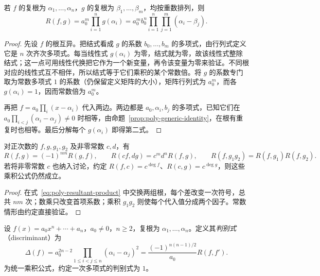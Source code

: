 \begin{theorem}[结式的根表达式]
\label{thm:poly-resultant-product}
若 $f$ 的复根为 $\alpha_1,\ldots,\alpha_n$，$g$ 的复根为 $\beta_1,\ldots,\beta_m$，均按重数排列，则
\begin{equation}
\label{eq:poly-resultant-product}
    R(f,g)=a_0^m\prod_{i=1}^n g(\alpha_i)
    =a_0^mb_0^n\prod_{i=1}^n\prod_{j=1}^m(\alpha_i-\beta_j).
\end{equation}
\end{theorem}
\begin{proof}
先设 $f$ 的根互异。把结式看成 $g$ 的系数 $b_0,\ldots,b_m$ 的多项式，由行列式定义它是 $n$ 次齐次多项式。每当线性式 $g(\alpha_i)$ 为零，结式就为零，故该线性式整除结式；这一点可用线性代换把它作为一个新变量，再令该变量为零来验证。不同根对应的线性式互不相伴，所以结式等于它们乘积的某个常数倍。将 $g$ 的系数专门取为常数多项式 $1$ 的系数（仍保留定义矩阵的大小），矩阵行列式为 $a_0^m$，而各 $g(\alpha_i)=1$，因而常数倍为 $a_0^m$。

再把 $f=a_0\prod_i(x-\alpha_i)$ 代入两边。两边都是 $a_0,\alpha_i,b_j$ 的多项式，已知它们在 $a_0\prod_{i<j}(\alpha_i-\alpha_j)\ne0$ 时相等，由命题~\ref{prop:poly-generic-identity}，在根有重复时也相等。最后分解每个 $g(\alpha_i)$ 即得第二式。
\end{proof}

\begin{corollary}
\label{cor:poly-resultant-properties}
对正次数的 $f,g,g_1,g_2$ 及非零常数 $c,d$，有
\[
    R(f,g)=(-1)^{nm}R(g,f),\qquad
    R(cf,dg)=c^md^nR(f,g),\qquad
    R(f,g_1g_2)=R(f,g_1)R(f,g_2).
\]
若将非零常数 $c$ 也纳入讨论，约定 $R(f,c)=c^{\deg f}$、$R(c,g)=c^{\deg g}$，则这些乘积公式仍然成立。
\end{corollary}
\begin{proof}
在式~\eqref{eq:poly-resultant-product} 中交换两组根，每个差改变一次符号，总共 $nm$ 次；数乘只改变首项系数；乘积 $g_1g_2$ 则使每个代入值分成两个因子。常数情形由约定直接验证。
\end{proof}

\begin{definition}
\label{def:poly-discriminant}
设 $f(x)=a_0x^n+\cdots+a_n$，$a_0\ne0$，$n\geq2$，复根为 $\alpha_1,\ldots,\alpha_n$。定义其\emph{判别式}（discriminant）为
\begin{equation}
\label{eq:poly-discriminant}
    \Delta(f)=a_0^{2n-2}\prod_{1\leq i<j\leq n}(\alpha_i-\alpha_j)^2
    =\frac{(-1)^{n(n-1)/2}}{a_0}R(f,f').
\end{equation}
为统一乘积公式，约定一次多项式的判别式为 $1$。
\end{definition}

